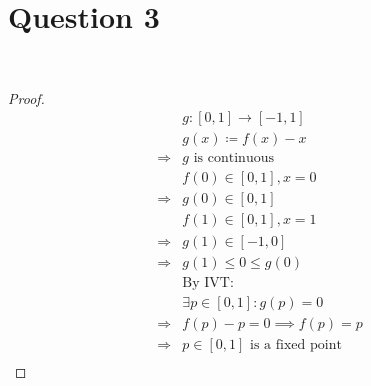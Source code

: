 \documentclass{article}
\begin{document}
\section*{Question 3}

~

\begin{proof}
    \begin{align*}
        &g:[0,1]\rightarrow[-1,1]\\
        &g(x)\coloneqq f(x)-x\\
        \Rightarrow&g\text{ is continuous}\\
        &f(0)\in [0,1],x=0\\
        \Rightarrow&g(0)\in[0,1]\\
        &f(1)\in[0,1],x=1\\
        \Rightarrow&g(1)\in[-1,0]\\
        \Rightarrow&g(1)\leqslant0\leqslant g(0)\\
        &\text{By IVT}:\\
        &\exists p\in[0,1]:g(p)=0\\
        \Rightarrow&f(p)-p=0\implies f(p)=p\\
        \Rightarrow&p\in[0,1]\text{ is a fixed point}\\
    \end{align*}
\end{proof}
\end{document}
